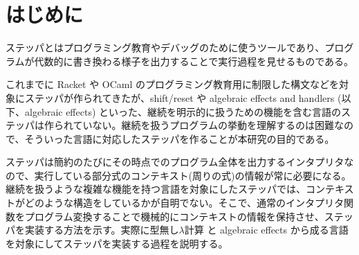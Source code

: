 \section{はじめに}
\label{sec:intro}

ステッパとはプログラミング教育やデバッグのために使うツールであり、プログラムが代数的に書き換わる様子を出力することで実行過程を見せるものである。

これまでに Racket \cite{JMM2001} や OCaml \cite{JT2019} のプログラミング教育用に制限した構文などを対象にステッパが作られてきたが、shift/reset \cite{OA1990} や algebraic effects and handlers \cite{何} (以下、algebraic effects) といった、継続を明示的に扱うための機能を含む言語のステッパは作られていない。継続を扱うプログラムの挙動を理解するのは困難なので、そういった言語に対応したステッパを作ることが本研究の目的である。

ステッパは簡約のたびにその時点でのプログラム全体を出力するインタプリタなので、実行している部分式のコンテキスト(周りの式)の情報が常に必要になる。継続を扱うような複雑な機能を持つ言語を対象にしたステッパでは、コンテキストがどのような構造をしているかが自明でない。そこで、通常のインタプリタ関数をプログラム変換することで機械的にコンテキストの情報を保持させ、ステッパを実装する方法を示す。実際に型無し$\lambda$計算 \cite{何} と algebraic effects から成る言語を対象にしてステッパを実装する過程を説明する。

